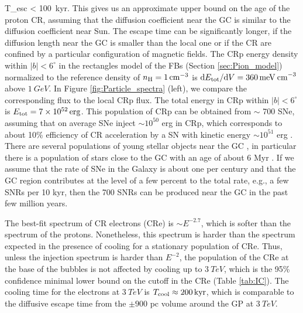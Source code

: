\be
T_{\rm esc} <  \approx \SI{100}{kyr}.
\ee
This gives us an approximate upper bound on the age of the proton CR, 
assuming that the diffusion coefficient near the GC is similar to the diffusion coefficient near Sun.
The escape time can be significantly longer, if the diffusion length near the GC is smaller than the local one
or if the CR are confined by a particular configuration of magnetic fields.
The CRp energy density within $|b| < 6^\circ$ in the rectangles model of the FBs (Section \ref{sec:Pion_model})  
normalized to the reference density of $n_{\text{H}} = \SI{1}{cm^{-3}}$
is $\text{d} E_{\text{tot}} / \text{d} V = \SI{360}{meV\: cm^{-3}}$ above $\SI{1}{GeV}$.
In Figure \ref{fig:Particle_spectra} (left), we compare the corresponding flux to the local CRp flux.
The total energy in CRp within $|b| < 6^\circ$ is $E_{\text{tot}} = \SI{7e52}{erg}$.
This population of CRp can be obtained from $\sim$ 700 SNe, 
assuming that on average SNe inject $\sim 10^{50}$ erg in CRp, which corresponds to about 10\% efficiency
of CR acceleration by a SN with kinetic energy $\sim 10^{51}$ erg \citep[e.g.,][]{Spurio2015}.
There are several populations of young stellar objects near the GC \citep{2009ApJ...702..178Y, 2012A&A...537A.121I},
in particular there is a population of stars close to the GC with an age of about 6 Myr \citep{2006ApJ...643.1011P}.
If we assume that the rate of SNe in the Galaxy is about one per century and that the GC region contributes at the level of
a few percent to the total rate, e.g., a few SNRs per 10 kyr, then the 700 SNRs can be produced near the GC
in the past few million years.


The best-fit spectrum of CR electrons (CRe) is $\sim E^{-2.7}$, which is softer than the spectrum of the protons.
Nonetheless, this spectrum is harder than the spectrum expected in the presence of cooling
for a stationary population of CRe.
Thus, unless the injection spectrum is harder than $E^{-2}$, the population of the CRe at the base of the 
bubbles is not affected by cooling up to $\SI{3}{TeV}$,
which is the 95\% confidence minimal lower bound on the cutoff in the CRe (Table \ref{tab:IC}). 
The cooling time for the electrons at %
$\SI{3}{TeV}$ is $T_{\rm cool} \approx \SI{200}{kyr}$,
which is comparable to the diffusive escape time from the $\pm 900$ pc volume around the GP at $\SI{3}{TeV}$.

